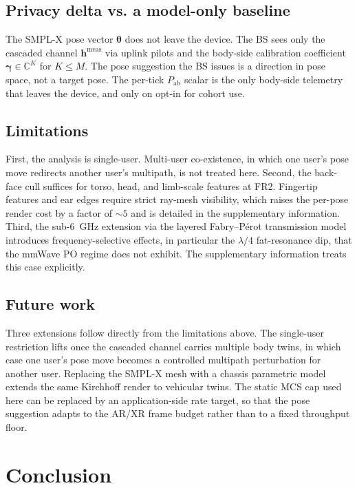 \documentclass[journal,twocolumn,10pt]{IEEEtran}
\theoremstyle{plain}
\theoremstyle{definition}
\theoremstyle{remark}
\newcommand{\hh}{\bm{h}}
\newcommand{\Pabs}{P_{\mathrm{ab}}}
\newcommand{\thetab}{\bm{\theta}}
\newcommand{\gammab}{\bm{\gamma}}
\newcommand{\Complex}{\mathbb{C}}
\begin{document}
\subsection{Privacy delta vs. a model-only baseline}

The SMPL-X pose vector $\thetab$ does not leave the device. The
BS sees only the cascaded channel $\hh^{\mathrm{meas}}$ via
uplink pilots and the body-side calibration coefficient
$\gammab\in\Complex^{K}$ for $K\leq M$. The pose suggestion the
BS issues is a direction in pose space, not a target pose. The
per-tick $\Pabs$ scalar is the only body-side telemetry that
leaves the device, and only on opt-in for cohort use.

\subsection{Limitations}

First, the analysis is single-user. Multi-user co-existence, in
which one user's pose move redirects another user's multipath,
is not treated here.
Second, the back-face cull suffices for torso, head, and
limb-scale features at FR2. Fingertip features and ear edges
require strict ray-mesh visibility, which raises the per-pose
render cost by a factor of $\sim\!5$ and is detailed in the
supplementary information.
Third, the sub-6~GHz extension via the layered Fabry--P\'erot
transmission model introduces frequency-selective effects, in
particular the $\lambda/4$ fat-resonance dip, that the mmWave PO
regime does not exhibit. The supplementary information treats
this case explicitly.

\subsection{Future work}

Three extensions follow directly from the limitations above.
The single-user restriction lifts once the cascaded channel
carries multiple body twins, in which case one user's pose move
becomes a controlled multipath perturbation for another user.
Replacing the SMPL-X mesh with a chassis parametric model
extends the same Kirchhoff render to vehicular twins. The static
MCS cap used here can be replaced by an application-side rate
target, so that the pose suggestion adapts to the AR/XR frame
budget rather than to a fixed throughput floor.


\section{Conclusion}\label{sec:conclusion}
\end{document}
